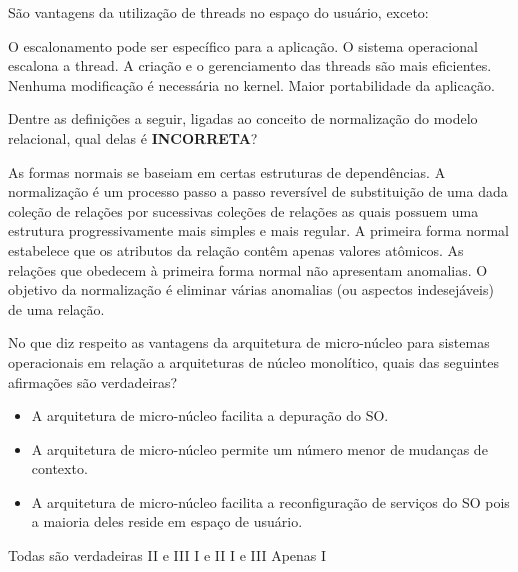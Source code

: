 \documentclass[12pt, addpoints]{exam}
\begin{document}
\begin{questions}
São vantagens da utilização de threads no espaço do usuário, exceto:
\begin{choices}
\choice O escalonamento pode ser específico para a aplicação.
\choice O sistema operacional escalona a thread.
\choice A criação e o gerenciamento das threads são mais eficientes.
\choice Nenhuma modificação é necessária no kernel.
\choice Maior portabilidade da aplicação.
\end{choices}

\question

Dentre as definições a seguir, ligadas ao conceito de normalização do modelo relacional, qual delas é \textbf{INCORRETA}?


\begin{choices}
\choice As formas normais se baseiam em certas estruturas de dependências.
\choice A normalização é um processo passo a passo reversível de substituição de uma dada coleção de relações por sucessivas coleções de relações as quais possuem uma estrutura progressivamente mais simples e mais regular.
\choice A primeira forma normal estabelece que os atributos da relação contêm apenas valores atômicos.
\choice As relações que obedecem à primeira forma normal não apresentam anomalias.
\choice O objetivo da normalização é eliminar várias anomalias (ou aspectos indesejáveis) de uma relação.
\end{choices}

\question

No que diz respeito as vantagens da arquitetura de micro-núcleo para sistemas operacionais em relação a arquiteturas de núcleo monolítico, quais das seguintes afirmações são verdadeiras?



\begin{itemize}

    \item[I] A arquitetura de micro-núcleo facilita a depuração do SO.

    \item[II] A arquitetura de micro-núcleo permite um número menor de mudanças de contexto.

    \item[III] A arquitetura de micro-núcleo facilita a reconfiguração de serviços do SO pois a maioria deles reside em espaço de usuário.

\end{itemize}
\begin{choices}
\choice Todas são verdadeiras
\choice II e III
\choice I e II
\choice I e III
\choice Apenas I
\end{choices}


\end{questions}
\end{document}
